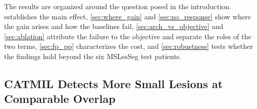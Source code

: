 The results are organized around the question posed in the introduction.
 establishes the main effect, \cref{sec:where_gain}
and \cref{sec:no_response} show where the gain arises and how the
baselines fail, \cref{sec:arch_vs_objective} and \cref{sec:ablation}
attribute the failure to the objective and separate the roles of the two
terms,
\cref{sec:fp_pp} characterizes the cost, and \cref{sec:robustness} tests
whether the findings hold beyond the six MSLesSeg test patients.

\subsection{CATMIL Detects More Small Lesions at Comparable Overlap}
\label{sec:main_results}

\begin{table}[t]
\centering
\caption{Comparison of CATMIL with standard losses and the instance-level
loss CC-DiceCE on the two test sets, without post-processing. Values are
the mean $\pm$ sample standard deviation over the five fold models. Best
values are shown in \textbf{bold}; second-best values are
\underline{underlined}. Paired differences with patient-level CIs are given
in \cref{tab:paired_differences}.}
\label{tab:loss_comparison_small_lesion}
\end{table}
